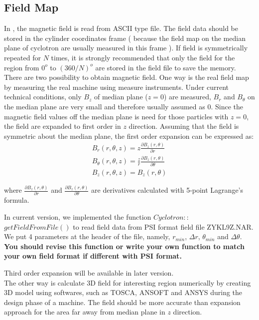 \subsection{Field Map}
\label{sec:opalcycl:fildmap}
In \opalcycl, the magnetic field is read from ASCII type file. The field data should be stored in the cylinder coordinates frame
( because the field map on the median plane of cyclotron are usually measured in this frame ).
If field is symmetrically repeated for $N$ times, it is strongly recommended that only the field for the region from
$0^o$ to $(360/N)^o$ are stored in the field file to save the memory.\\     

There are two possibility to obtain magnetic field.
One way is the real field map  by measuring the real machine using measure instruments.
Under current technical conditions, only $B_z$ of median plane ($z=0$) are measured, 
$B_r$ and $B_\theta$ on the median plane are very small and therefore usually assumed as 0.
Since the magnetic field values off the median plane is need for those particles with $z=0$, 
the field are expanded to first order in $z$ direction. Assuming that the field is symmetric about the median plane,
the first order expansion can be expressed as:
\begin{eqnarray}\label{eq:Bfield}
B_r(r,\theta, z) = z\frac{\partial B_z(r,\theta)}{\partial r}\nonumber\\    
B_\theta(r,\theta, z) = \frac{z}{r}\frac{\partial B_z(r,\theta)}{\partial \theta}\\     
B_z(r,\theta, z) = B_z(r,\theta)\nonumber     
\end{eqnarray}

where $\frac{\partial B_z(r,\theta)}{\partial r}$ and $\frac{\partial B_z(r,\theta)}{\partial \theta}$
are derivatives calculated with 5-point Lagrange's formula.

In current version, we implemented the function $Cyclotron::$$getFieldFromFile()$ to read field data from 
PSI format field file {\small{ZYKL9Z.NAR}}. We put 4 parameters at the header of the file, namely, $r_{min}$, $\Delta r$,
$\theta_{min}$ and $\Delta \theta$.
{\bfseries You should revise this function or write your own function to match your own field
  format if different with PSI format.} 

Third order expansion will be available in later version.\\

The other way is calculate 3D field for interesting region numerically by creating 3D model using softwares,
such as TOSCA, ANSOFT and ANSYS during the design phase of a machine. The field should be more accurate than 
expansion approach for the area far away from median plane in $z$ direction.

